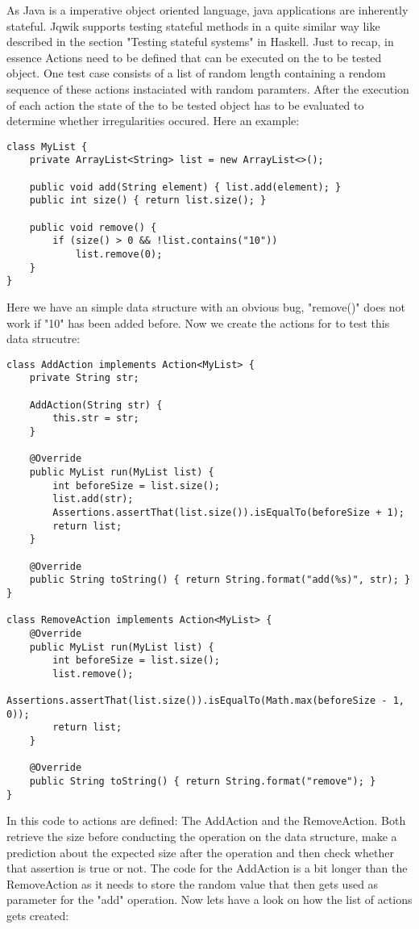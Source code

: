 \documentclass[a4paper, 12pt]{article} %
\begin{document}
As Java is a imperative object oriented language, java applications are inherently stateful. Jqwik supports testing stateful methods in a quite similar way like described in the section "Testing stateful systems" in Haskell. Just to recap, in essence Actions need to be defined that can be executed on the to be tested object. One test case consists of a list of random length containing a rendom sequence of these actions instaciated with random paramters. After the execution of each action the state of the to be tested object has to be evaluated to determine whether irregularities occured. Here an example:

\begin{verbatim}
class MyList {
    private ArrayList<String> list = new ArrayList<>();

    public void add(String element) { list.add(element); }
    public int size() { return list.size(); }

    public void remove() {
        if (size() > 0 && !list.contains("10"))
            list.remove(0);
    }
}
\end{verbatim} 

Here we have an simple data structure with an obvious bug, "remove()" does not work if "10" has been added before. Now we create the actions for to test this data strucutre:

\begin{verbatim}
class AddAction implements Action<MyList> {
    private String str;

    AddAction(String str) {
        this.str = str;
    }

    @Override
    public MyList run(MyList list) {
        int beforeSize = list.size();
        list.add(str);
        Assertions.assertThat(list.size()).isEqualTo(beforeSize + 1);
        return list;
    }

    @Override
    public String toString() { return String.format("add(%s)", str); }
}

class RemoveAction implements Action<MyList> {
    @Override
    public MyList run(MyList list) {
        int beforeSize = list.size();
        list.remove();
        Assertions.assertThat(list.size()).isEqualTo(Math.max(beforeSize - 1, 0));
        return list;
    }

    @Override
    public String toString() { return String.format("remove"); }
}
\end{verbatim} 

In this code to actions are defined: The AddAction and the RemoveAction. Both retrieve the size before conducting the operation on the data structure, make a prediction about the expected size after the operation and then check whether that assertion is true or not. The code for the AddAction is a bit longer than the RemoveAction as it needs to store the random value that then gets used as parameter for the "add" operation. Now lets have a look on how the list of actions gets created:
\end{document}
